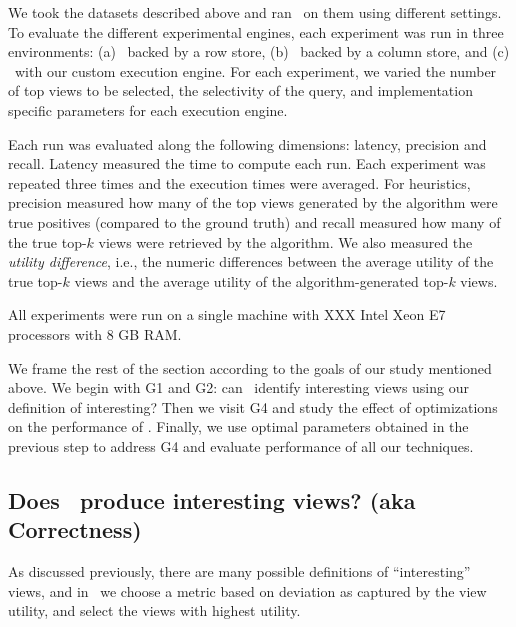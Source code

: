 We took the datasets described above and ran \VizRecDB\ on them using different
settings.
To evaluate the different experimental engines, each experiment was run in three
environments: (a) \VizRecDB\ backed by a row store, (b) \VizRecDB\ backed by a
column store, and (c) \VizRecDB\ with our custom execution engine.
For each experiment, we varied the number of top views to be selected, the
selectivity of the query, and implementation specific parameters for each
execution engine.

Each run was evaluated along the following dimensions: latency, precision and
recall. 
Latency measured the time to compute each run. Each experiment was
repeated three times and the execution times were averaged.
For heuristics, precision measured
how many of the top views generated by the algorithm were true positives
(compared to the ground truth) and recall measured how many of the true top-$k$
views were retrieved by the algorithm.
We also measured the {\it utility difference}, i.e., the numeric differences
between the average utility of the true top-$k$ views and the average utility of
the algorithm-generated top-$k$ views.

All experiments were run on a single
machine with XXX Intel Xeon E7 processors with 8 GB
RAM.

We frame the rest of the section according to the goals of our study mentioned
above.
We begin with G1 and G2: can \VizRecDB\ identify interesting views using our
definition of interesting? Then we visit G4 and study the effect of
optimizations on the performance of \VizRecDB. 
Finally, we use optimal parameters obtained in the previous step to
address G4 and evaluate performance of all our techniques.


\subsection{Does \VizRecDB\ produce interesting views? (aka Correctness)}
\label{sec:expt_accuracy}

As discussed previously, there are many possible definitions of ``interesting''
views, and in \VizRecDB\ we choose a metric based on deviation as captured by
the view utility, and select the views with highest utility.

